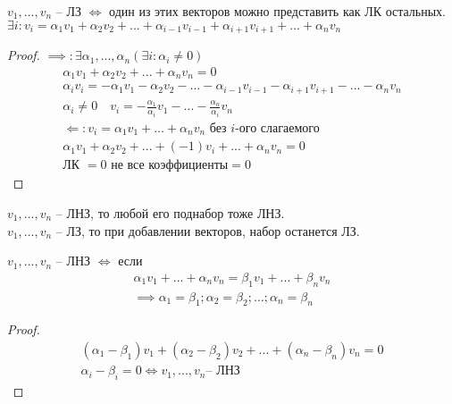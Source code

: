 \begin{theorem}
    $v_1,...,v_n$ -- ЛЗ $\Leftrightarrow$ один из этих векторов можно представить как ЛК остальных.
    $\exists i: v_i= \alpha_1 v_1 +\alpha_2 v_2 + ... + \alpha_{i-1} v_{i-1} + \alpha_{i+1} v_{i+1} + ... +\alpha_n v_n$
\end{theorem}
\begin{proof}
    $\implies : \exists \alpha_1,...,\alpha_n (\exists i: \alpha_i \neq 0)$
    \begin{gather*}
        \alpha_1 v_1 + \alpha_2 v_2 + ... + \alpha_n v_n = 0\\
        \alpha_i v_i = - \alpha_1 v_1 - \alpha_2 v_2 - ... - \alpha_{i-1} v_{i-1} - \alpha_{i+1} v_{i+1} - ... -\alpha_n v_n\\
        \alpha_i \neq 0 \quad v_i = -\frac{\alpha_1}{\alpha_i}v_1 -... - \frac{\alpha_n}{\alpha_i}v_n\\
        \Leftarrow: v_i = \alpha_1 v_1 + ... + \alpha_n v_n \text{ без } i\text{-ого слагаемого}\\
        \alpha_1 v_1 + \alpha_2 v_2 + ... + (-1)v_i + ... + \alpha_n v_n =0\\
        \text{ЛК } = 0 \text{ не все коэффициенты} = 0
    \end{gather*}
\end{proof}

\begin{prop}
    $v_1,...,v_n $ -- ЛНЗ, то любой его поднабор тоже ЛНЗ.\\
    $v_1,...,v_n $ -- ЛЗ, то при добавлении векторов, набор останется ЛЗ.
\end{prop}


\begin{theorem}
    $v_1,..., v_n$ -- ЛНЗ $\Leftrightarrow$ если
    \begin{gather*}
        \alpha_1 v_1 + ... + \alpha_n v_n = \beta_1 v_1 + ... + \beta_n v_n\\
        \implies \alpha_1 = \beta_1; \alpha_2 = \beta_2; ... ; \alpha_n = \beta_n
    \end{gather*}
\end{theorem}
\begin{proof}
    \begin{gather*}
        (\alpha_1 - \beta_1)v_1 + (\alpha_2 - \beta_2)v_2 + ...
        + (\alpha_n - \beta_n)v_n = 0\\
        \alpha_i - \beta_i = 0 \Leftrightarrow v_1, ..., v_n\text{-- ЛНЗ}
    \end{gather*}
\end{proof}